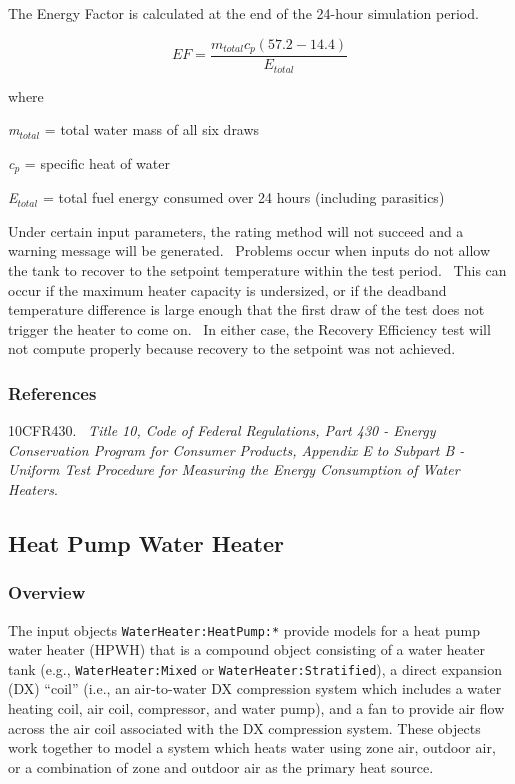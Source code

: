 The Energy Factor is calculated at the end of the 24-hour simulation period.

\begin{equation}
EF = \frac{{{m_{total}}{c_p}\left( {57.2 - 14.4} \right)}}{{{E_{total}}}}
\end{equation}

where

\emph{m\(_{total}\)} = total water mass of all six draws

\emph{c\(_{p}\)} = specific heat of water

\emph{E\(_{total}\)} = total fuel energy consumed over 24 hours (including parasitics)

Under certain input parameters, the rating method will not succeed and a warning message will be generated.~ Problems occur when inputs do not allow the tank to recover to the setpoint temperature within the test period.~ This can occur if the maximum heater capacity is undersized, or if the deadband temperature difference is large enough that the first draw of the test does not trigger the heater to come on.~ In either case, the Recovery Efficiency test will not compute properly because recovery to the setpoint was not achieved.

\subsubsection{References}\label{references-053}

10CFR430.~ \emph{Title 10, Code of Federal Regulations, Part 430 - Energy Conservation Program for Consumer Products, Appendix E to Subpart B - Uniform Test Procedure for Measuring the Energy Consumption of Water Heaters}.

\subsection{Heat Pump Water Heater}\label{heat-pump-water-heater}

\subsubsection{Overview}\label{overview-029}

The input objects \lstinline!WaterHeater:HeatPump:*! provide models for a heat pump water heater (HPWH) that is a compound object consisting of a water heater tank (e.g., \lstinline!WaterHeater:Mixed! or \lstinline!WaterHeater:Stratified!), a direct expansion (DX) ``coil'' (i.e., an air-to-water DX compression system which includes a water heating coil, air coil, compressor, and water pump), and a fan to provide air flow across the air coil associated with the DX compression system. These objects work together to model a system which heats water using zone air, outdoor air, or a combination of zone and outdoor air as the primary heat source.

